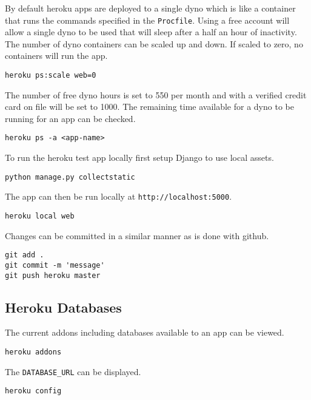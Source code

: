 \documentclass[]{book}
\begin{document}
By default heroku apps are deployed to a single dyno which is like a
container that runs the commands specified in the \texttt{Procfile}.
Using a free account will allow a single dyno to be used that will sleep
after a half an hour of inactivity. The number of dyno containers can be
scaled up and down. If scaled to zero, no containers will run the app.

\begin{verbatim}
heroku ps:scale web=0
\end{verbatim}

The number of free dyno hours is set to 550 per month and with a
verified credit card on file will be set to 1000. The remaining time
available for a dyno to be running for an app can be checked.

\begin{verbatim}
heroku ps -a <app-name>
\end{verbatim}

To run the heroku test app locally first setup Django to use local
assets.

\begin{verbatim}
python manage.py collectstatic
\end{verbatim}

The app can then be run locally at \texttt{http://localhost:5000}.

\begin{verbatim}
heroku local web
\end{verbatim}

Changes can be committed in a similar manner as is done with github.

\begin{verbatim}
git add .
git commit -m 'message'
git push heroku master
\end{verbatim}

\subsection{Heroku Databases}\label{heroku-databases}

The current addons including databases available to an app can be
viewed.

\begin{verbatim}
heroku addons
\end{verbatim}

The \texttt{DATABASE\_URL} can be displayed.

\begin{verbatim}
heroku config
\end{verbatim}
\end{document}
